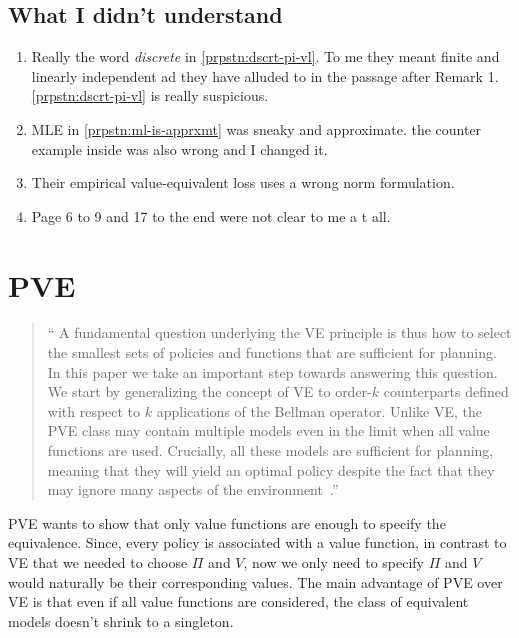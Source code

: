 \documentclass[a4paper]{article}
\theoremstyle{definition}
\theoremstyle{remark}
\theoremstyle{plain}
\begin{document}
\subsection{What I didn't understand}
\begin{enumerate}[label=(\Alph*)]
    \item Really the word \emph{discrete} in \cref{prpstn:dscrt-pi-vl}. To me they meant finite and linearly independent ad they have alluded to in the passage after Remark 1. \cref{prpstn:dscrt-pi-vl} is really suspicious.

    \item MLE in \cref{prpstn:ml-is-apprxmt} was sneaky and approximate. the counter example inside was also wrong and I changed it.

    \item Their empirical value-equivalent loss uses a wrong norm formulation.

    \item Page 6 to 9 and 17 to the end were not clear to me a t all. 
\end{enumerate}

\section{PVE}
\begin{quote}
    `` A fundamental question underlying the VE
principle is thus how to select the smallest sets of policies and functions that are sufficient for planning. In this paper we take an important step towards answering this question. We start by generalizing the concept of VE to order-$k$ counterparts defined with respect to $k$ applications of the Bellman operator. Unlike VE, the PVE class may contain multiple models even in the limit when all value functions are used. Crucially, all these models are sufficient for planning, meaning that they will yield an optimal policy despite the fact that they may ignore many aspects of the environment~\citep{grimm2021proper}.''
\end{quote}
%
PVE wants to show that only value functions are enough to specify the equivalence. Since, every policy is associated with a value function, in contrast to VE that we needed to choose $\Pi$ and $V$, now we only need to specify $\Pi$ and $V$ would naturally be their corresponding values. The main advantage of PVE over VE is that even if all value functions are considered, the class of equivalent models doesn't shrink to a singleton.
\end{document}
